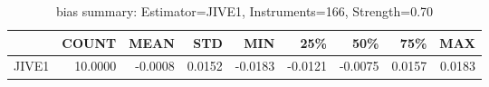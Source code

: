 \begin{table}[ht]
\centering
\caption{bias summary: Estimator=JIVE1, Instruments=166, Strength=0.70}
\begin{tabular}{lrrrrrrrr}
\toprule
 & COUNT & MEAN & STD & MIN & 25\% & 50\% & 75\% & MAX \\
\midrule
JIVE1 & 10.0000 & -0.0008 & 0.0152 & -0.0183 & -0.0121 & -0.0075 & 0.0157 & 0.0183 \\
\bottomrule
\end{tabular}
\end{table}
